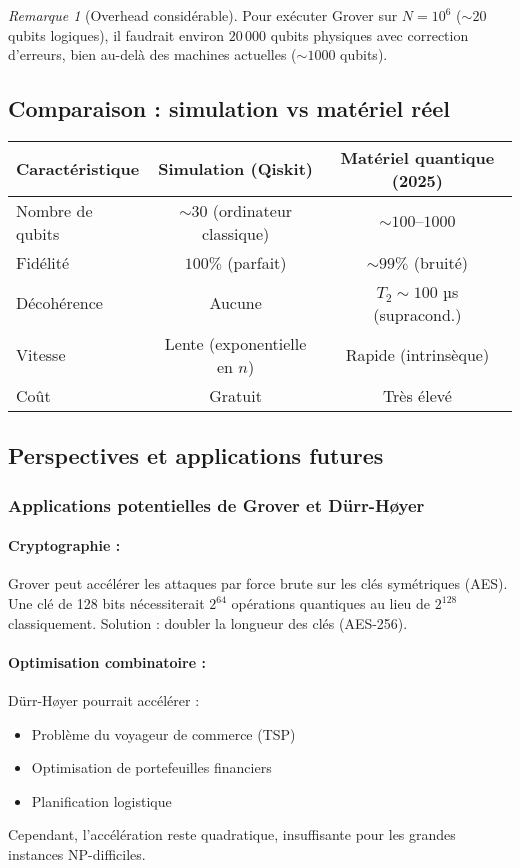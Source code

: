 \documentclass[12pt,a4paper]{article}
\theoremstyle{definition}
\theoremstyle{remark}
\newtheorem{remark}[theorem]{Remarque}
\begin{document}
\begin{remark}[Overhead considérable]
Pour exécuter Grover sur $N = 10^6$ ($\sim 20$ qubits logiques), il faudrait environ $20\,000$ qubits physiques avec correction d'erreurs, bien au-delà des machines actuelles ($\sim 1000$ qubits).
\end{remark}

\subsection{Comparaison : simulation vs matériel réel}

\begin{center}
\begin{tabular}{|l|c|c|}
\hline
\textbf{Caractéristique} & \textbf{Simulation (Qiskit)} & \textbf{Matériel quantique (2025)} \\
\hline
Nombre de qubits & $\sim 30$ (ordinateur classique) & $\sim 100\text{--}1000$ \\
Fidélité & $100\%$ (parfait) & $\sim 99\%$ (bruité) \\
Décohérence & Aucune & $T_2 \sim 100$ µs (supracond.) \\
Vitesse & Lente (exponentielle en $n$) & Rapide (intrinsèque) \\
Coût & Gratuit & Très élevé \\
\hline
\end{tabular}
\end{center}

\subsection{Perspectives et applications futures}

\subsubsection{Applications potentielles de Grover et Dürr-Høyer}

\paragraph{Cryptographie :}
Grover peut accélérer les attaques par force brute sur les clés symétriques (AES). Une clé de 128 bits nécessiterait $2^{64}$ opérations quantiques au lieu de $2^{128}$ classiquement. Solution : doubler la longueur des clés (AES-256).

\paragraph{Optimisation combinatoire :}
Dürr-Høyer pourrait accélérer :
\begin{itemize}
    \item Problème du voyageur de commerce (TSP)
    \item Optimisation de portefeuilles financiers
    \item Planification logistique
\end{itemize}
Cependant, l'accélération reste quadratique, insuffisante pour les grandes instances NP-difficiles.
\end{document}
